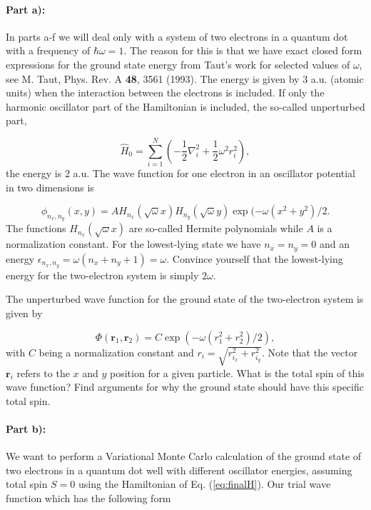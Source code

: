 \documentclass[oneside,final,a4wide,10pt]{article}
\begin{document}
\paragraph{Part a):}
In parts  a-f we will deal only with a system of
two electrons in a quantum dot with a frequency of $\hbar\omega = 1$. 
The reason for this is that we have exact closed form expressions 
for the ground state energy from Taut's work for selected values of $\omega$, 
see M. Taut, Phys. Rev. A \textbf{48}, 3561 (1993).
The energy is given by $3$ a.u.  (atomic units) when the interaction between the electrons is included.
If only the harmonic oscillator part of the Hamiltonian is included,
the so-called unperturbed part,

\begin{equation} \hat{H}_0=\sum_{i=1}^{N} \left(  -\frac{1}{2} \nabla_i^2 + \frac{1}{2} \omega^2r_i^2  \right),\end{equation}
the energy is $2$ a.u.
The wave function for one electron in an oscillator potential in two dimensions is

\begin{equation}
\phi_{n_x,n_y}(x,y) = A H_{n_x}(\sqrt{\omega}x)H_{n_y}(\sqrt{\omega}y)\exp{(-\omega(x^2+y^2)/2}.
\end{equation}
The functions $H_{n_x}(\sqrt{\omega}x)$ are so-called Hermite polynomials while $A$ is a normalization constant. 
For the lowest-lying state we have $n_x=n_y=0$ and an energy $\epsilon_{n_x,n_y}=\omega(n_x+n_y+1) = \omega$.
Convince yourself that the lowest-lying energy for the two-electron system  is simply $2\omega$.

The unperturbed wave function for the ground state of the two-electron system is given by

\begin{equation}
\Phi(\bm{r}_1,\bm{r}_2) = C\exp{\left(-\omega(r_1^2+r_2^2)/2\right)},
\end{equation}
with $C$ being a normalization constant and $r_i = \sqrt{r_{i_x}^2+r_{i_y}^2}$. Note that the vector $\bm{r}_i$ 
refers to the $x$ and $y$ position for a given particle.
What is the total spin of this wave function? Find arguments for why the ground state should have
this specific total spin. 

\paragraph{Part  b):}
We want to perform  a Variational Monte Carlo calculation of the ground state of two electrons in a quantum dot well with different oscillator energies, assuming total spin $S=0$ using the Hamiltonian of
Eq. (\ref{eq:finalH}). 
Our trial wave function which has the following form
\end{document}
